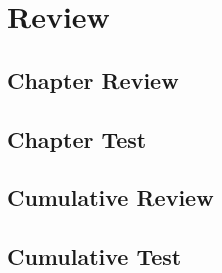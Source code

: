 \newpage
\section{Review}
\subsection{Chapter Review}
\subsection{Chapter Test}
\subsection{Cumulative Review}
\subsection{Cumulative Test}


